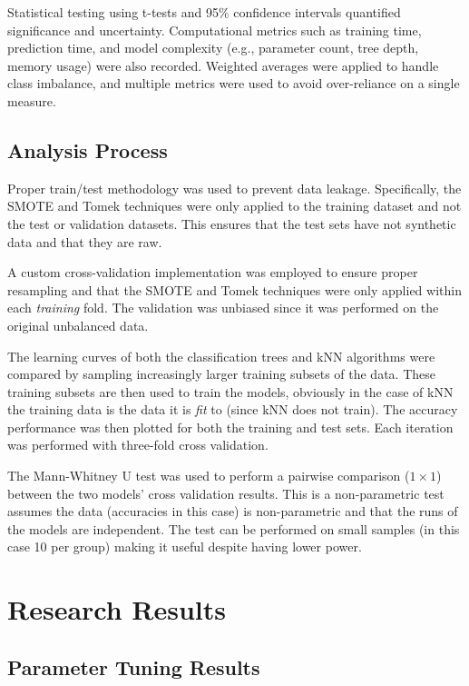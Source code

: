 \documentclass[10pt, conference]{IEEEtran}
\begin{document}
Statistical testing using t-tests and 95\% confidence intervals quantified significance and uncertainty. Computational metrics such as training time, prediction time, and model complexity (e.g., parameter count, tree depth, memory usage) were also recorded. Weighted averages were applied to handle class imbalance, and multiple metrics were used to avoid over-reliance on a single measure.

\subsection{Analysis Process}
Proper train/test methodology was used to prevent data leakage. Specifically, the SMOTE and Tomek techniques were only applied to the training dataset and not the test or validation datasets. This ensures that the test sets have not synthetic data and that they are raw.

A custom cross-validation implementation was employed to ensure proper resampling and that the SMOTE and Tomek techniques were only applied within each \textit{training} fold. The validation was unbiased since it was performed on the original unbalanced data.

The learning curves of both the classification trees and kNN algorithms were compared by sampling increasingly larger training subsets of the data. These training subsets are then used to train the models, obviously in the case of kNN the training data is the data it is \textit{fit} to (since kNN does not train). The accuracy performance was then plotted for both the training and test sets. Each iteration was performed with three-fold cross validation.

The Mann-Whitney U test \cite{mann1947test} was used to perform a pairwise comparison ($1 \times 1$) between the two models' cross validation results.  This is a non-parametric test assumes the data (accuracies in this case) is non-parametric and that the runs of the models are independent. The test can be performed on small samples (in this case 10 per group) making it useful despite having lower power.

\section{Research Results}
\subsection{Parameter Tuning Results}
\end{document}
